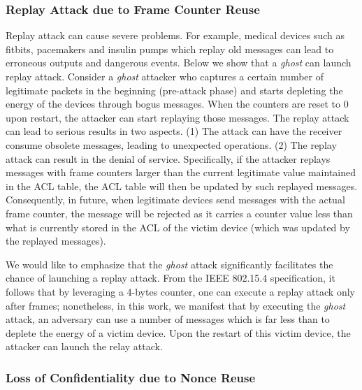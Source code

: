 \documentclass[10pt,journal,cspaper,compsoc]{IEEEtran}
\begin{document}
\subsubsection{Replay Attack due to Frame Counter Reuse}\label{sec:replayattack:reuse}
Replay attack can cause severe problems. For example, medical devices such as fitbits, pacemakers and insulin pumps which replay old messages can lead to erroneous outputs and dangerous events. Below we show that a {\em ghost} can launch replay attack. Consider a {\em ghost} attacker who captures  a certain number of legitimate packets in the beginning (pre-attack phase) and starts depleting the energy of the devices through bogus messages. When the counters are reset to 0 upon restart, the attacker can start replaying those messages. The replay attack can lead to serious results in two aspects. (1) The attack can have the receiver consume obsolete messages, leading to unexpected operations. (2) The replay attack can result in the denial of service. Specifically, if the attacker replays messages with frame counters larger than the current legitimate value maintained in the ACL table, the ACL table will then be updated by such replayed messages. Consequently, in future, when legitimate devices send messages with the actual frame counter, the message will be rejected as it carries a counter value less than what is currently stored in the ACL of the victim device (which was updated by the replayed messages).

We would like to emphasize that the {\em ghost} attack significantly facilitates the chance of launching a replay attack. From the IEEE 802.15.4 specification, it follows that by leveraging a 4-bytes counter, one can execute a replay attack only after  frames; nonetheless, in this work, we manifest that by executing the {\em ghost} attack, an adversary can use a number of messages which is far less than  to deplete the energy of a victim device. Upon the restart of this victim device, the attacker can launch the relay attack.

\subsubsection{Loss of Confidentiality due to Nonce Reuse}
\end{document}
